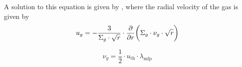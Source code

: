         A solution to this equation is given by \cite{lynden-bell_pringle_1974}, where the 
        radial velocity of the gas is given by
        \begin{equation}
            u_{g}
            =-\frac{3}{\Sigma_g\cdot\sqrt{r}}
                \cdot\frac{\partial }{\partial r}\bigg(\Sigma_g \cdot \nu_g \cdot \sqrt{r}\bigg)
        \end{equation}

        \begin{equation}
            \nu_g = \frac{1}{2} \cdot u_\text{th} \cdot \lambda_\text{mfp}
        \end{equation}

        


